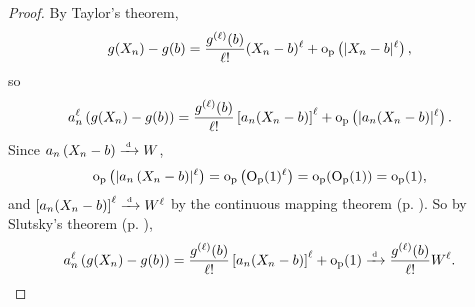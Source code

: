 \documentclass[11pt,letterpaper,reqno,oneside]{article}
\begin{document}
\begin{proof}
	By Taylor's theorem,
	\begin{equation*}
		g(X_n) - g(b) 
		= \frac{g^{(\ell)}(b)}{\ell !} (X_n-b)^\ell
		+ \mathrm{o}_{\mathrm{p}}\left( \lvert X_n-b\rvert^\ell \right) ,
	\end{equation*}
	so
	\begin{equation*}
		a_n^\ell \left( g(X_n) - g(b) \right)
		= \frac{g^{(\ell)}(b)}{\ell !} \left[ a_n (X_n-b) \right]^\ell
		+ \mathrm{o}_{\mathrm{p}}\left( \lvert a_n(X_n-b)\rvert^\ell \right) .
	\end{equation*}
	Since $a_n \left( X_n-b \right) \xrightarrow{{\scriptscriptstyle \mathrm{\;d\;}}} W$,
	\begin{equation*}
		\mathrm{o}_{\mathrm{p}}\left( \lvert a_n \left( X_n-b \right) \rvert^\ell \right) 
		= \mathrm{o}_{\mathrm{p}}\left( \mathrm{O}_{\mathrm{p}}(1)^\ell \right) 
		= \mathrm{o}_{\mathrm{p}}( \mathrm{O}_{\mathrm{p}}(1) ) 
		= \mathrm{o}_{\mathrm{p}}(1) ,
	\end{equation*}
	and $\left[ a_n (X_n-b) \right]^\ell \xrightarrow{{\scriptscriptstyle \mathrm{\;d\;}}} W^\ell$ by the continuous mapping theorem (p. \pageref{theorem:Mann--Wald_CMT}). So by Slutsky's theorem (p. \pageref{corollary:Slutsky}),
	\begin{equation*}
		a_n^\ell \left( g(X_n) - g(b) \right)
		= \frac{g^{(\ell)}(b)}{\ell !} \left[ a_n (X_n-b) \right]^\ell
		+ \mathrm{o}_{\mathrm{p}}(1)
		\xrightarrow{{\scriptscriptstyle \mathrm{\;d\;}}} \frac{g^{(\ell)}(b)}{\ell !} W^\ell . \qedhere
	\end{equation*}
\end{proof}
\end{document}
